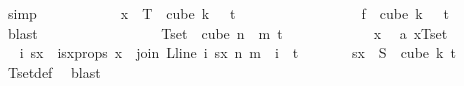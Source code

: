 \begin{isabellebody}
\ simp\isanewline
\ \ \ \ \ \ \ \ \isamarkupfalse%
\ \isamarkupfalse%
\ {\isachardoublequoteopen}x\ {\isasymin}\ T\ {\isacharbackquote}{\kern0pt}\ cube\ {\isacharparenleft}{\kern0pt}k\ {\isacharplus}{\kern0pt}\ {}{\isacharparenright}{\kern0pt}\ {\isacharparenleft}{\kern0pt}t\ {\isacharplus}{\kern0pt}\ {}{\isacharparenright}{\kern0pt}{\isachardoublequoteclose}\ \isamarkupfalse%
\ {\isacharasterisk}{\kern0pt}\ \isanewline
\ \ \ \ \ \ \ \ \ \ \isamarkupfalse%
\ {\isacartoucheopen}f\ {\isasymin}\ cube\ {\isacharparenleft}{\kern0pt}k\ {\isacharplus}{\kern0pt}\ {}{\isacharparenright}{\kern0pt}\ {\isacharparenleft}{\kern0pt}t\ {\isacharplus}{\kern0pt}\ {}{\isacharparenright}{\kern0pt}{\isacartoucheclose}\ \isamarkupfalse%
\ blast\isanewline
\ \ \ \ \ \ \isamarkupfalse%
\isanewline
\isanewline
\isanewline
\ \ \ \ \isamarkupfalse%
\isanewline
\ \ \ \ \isamarkupfalse%
\ {\isachardoublequoteopen}Tset\ {\isasymsubseteq}\ cube\ {\isacharparenleft}{\kern0pt}n\ {\isacharplus}{\kern0pt}\ m{\isacharparenright}{\kern0pt}\ {\isacharparenleft}{\kern0pt}t{\isacharplus}{\kern0pt}{}{\isacharparenright}{\kern0pt}{\isachardoublequoteclose}\isanewline
\ \ \ \ \isamarkupfalse%
\isanewline
\ \ \ \ \ \ \isamarkupfalse%
\ x\ \isamarkupfalse%
\ a{\isacharcolon}{\kern0pt}\ {\isachardoublequoteopen}x{\isasymin}Tset{\isachardoublequoteclose}\isanewline
\ \ \ \ \ \ \isamarkupfalse%
\ \isamarkupfalse%
\ i\ sx\ \ isx{\isacharunderscore}{\kern0pt}props{\isacharcolon}{\kern0pt}\ {\isachardoublequoteopen}x\ {\isacharequal}{\kern0pt}\ join\ {\isacharparenleft}{\kern0pt}L{\isacharunderscore}{\kern0pt}line\ i{\isacharparenright}{\kern0pt}\ sx\ n\ m\ {\isasymand}\ i\ {\isasymin}\ {\isacharbraceleft}{\kern0pt}{\isachardot}{\kern0pt}{\isachardot}{\kern0pt}{\isacharless}{\kern0pt}t{\isacharplus}{\kern0pt}{}{\isacharbraceright}{\kern0pt}\ {\isasymand}\isanewline
\ \ \ \ \ \ sx\ {\isasymin}\ S\ {\isacharbackquote}{\kern0pt}\ {\isacharparenleft}{\kern0pt}cube\ k\ {\isacharparenleft}{\kern0pt}t{\isacharplus}{\kern0pt}{}{\isacharparenright}{\kern0pt}{\isacharparenright}{\kern0pt}{\isachardoublequoteclose}\ \isamarkupfalse%
\ Tset{\isacharunderscore}{\kern0pt}def\ \isamarkupfalse%
\ blast\isanewline
\ \ \ \ \ \ \isamarkupfalse%
\ \isamarkupfalse%

\end{isabellebody}
